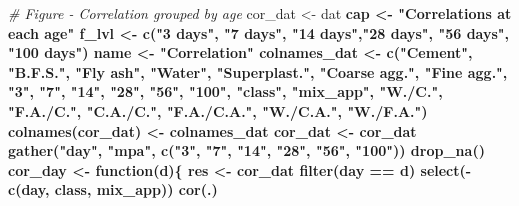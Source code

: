 \documentclass[
]{article}
\newenvironment{Shaded}{\begin{snugshade}}{\end{snugshade}}
\newcommand{\CommentTok}[1]{\textcolor[rgb]{0.56,0.35,0.01}{\textit{#1}}}
\newcommand{\ControlFlowTok}[1]{\textcolor[rgb]{0.13,0.29,0.53}{\textbf{#1}}}
\newcommand{\KeywordTok}[1]{\textcolor[rgb]{0.13,0.29,0.53}{\textbf{#1}}}
\newcommand{\NormalTok}[1]{#1}
\newcommand{\OperatorTok}[1]{\textcolor[rgb]{0.81,0.36,0.00}{\textbf{#1}}}
\newcommand{\StringTok}[1]{\textcolor[rgb]{0.31,0.60,0.02}{#1}}
\begin{document}
\label{show-correlation}

\begin{Shaded}
\begin{Highlighting}[]
\CommentTok{# Figure - Correlation grouped by age}
\NormalTok{cor_dat <-}\StringTok{ }\NormalTok{dat }\OperatorTok{%
\NormalTok{cap <-}\StringTok{ "Correlations at each age"}
\NormalTok{f_lvl <-}\StringTok{ }\KeywordTok{c}\NormalTok{(}\StringTok{"3 days"}\NormalTok{, }\StringTok{"7 days"}\NormalTok{, }\StringTok{"14 days"}\NormalTok{,}\StringTok{"28 days"}\NormalTok{, }\StringTok{"56 days"}\NormalTok{, }\StringTok{"100 days"}\NormalTok{)}
\NormalTok{name <-}\StringTok{ "Correlation"}
\NormalTok{colnames_dat <-}\StringTok{ }\KeywordTok{c}\NormalTok{(}\StringTok{"Cement"}\NormalTok{, }\StringTok{"B.F.S."}\NormalTok{, }\StringTok{"Fly ash"}\NormalTok{, }\StringTok{"Water"}\NormalTok{,}
                \StringTok{"Superplast."}\NormalTok{, }\StringTok{"Coarse agg."}\NormalTok{, }\StringTok{"Fine agg."}\NormalTok{,}
                \StringTok{"3"}\NormalTok{, }\StringTok{"7"}\NormalTok{, }\StringTok{"14"}\NormalTok{, }\StringTok{"28"}\NormalTok{, }\StringTok{"56"}\NormalTok{, }\StringTok{"100"}\NormalTok{,}
                \StringTok{"class"}\NormalTok{, }\StringTok{"mix_app"}\NormalTok{, }\StringTok{"W./C."}\NormalTok{, }\StringTok{"F.A./C."}\NormalTok{, }
                \StringTok{"C.A./C."}\NormalTok{, }\StringTok{"F.A./C.A."}\NormalTok{,}
                \StringTok{"W./C.A."}\NormalTok{, }\StringTok{"W./F.A."}\NormalTok{)}
\KeywordTok{colnames}\NormalTok{(cor_dat) <-}\StringTok{ }\NormalTok{colnames_dat}
\NormalTok{cor_dat <-}\StringTok{ }\NormalTok{cor_dat }\OperatorTok{%
\StringTok{  }\KeywordTok{gather}\NormalTok{(}\StringTok{"day"}\NormalTok{, }\StringTok{"mpa"}\NormalTok{, }\KeywordTok{c}\NormalTok{(}\StringTok{"3"}\NormalTok{, }\StringTok{"7"}\NormalTok{, }\StringTok{"14"}\NormalTok{, }\StringTok{"28"}\NormalTok{, }\StringTok{"56"}\NormalTok{, }\StringTok{"100"}\NormalTok{)) }\OperatorTok{%
\StringTok{  }\KeywordTok{drop_na}\NormalTok{()}
\NormalTok{cor_day <-}\StringTok{ }\ControlFlowTok{function}\NormalTok{(d)\{}
\NormalTok{  res <-}\StringTok{ }\NormalTok{cor_dat }\OperatorTok{%
\StringTok{    }\KeywordTok{filter}\NormalTok{(day }\OperatorTok{==}\StringTok{ }\NormalTok{d) }\OperatorTok{%
\StringTok{    }\KeywordTok{select}\NormalTok{(}\OperatorTok{-}\KeywordTok{c}\NormalTok{(day, class, mix_app)) }\OperatorTok{%
\StringTok{    }\KeywordTok{cor}\NormalTok{(.)}
}}}}}}
\end{Highlighting}
\end{Shaded}
\end{document}
